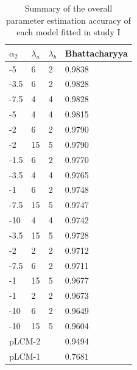 \documentclass[11 pt, a4paper]{article}  %
\begin{document}
\begin{table}[h]
\centering
\caption{Summary of the overall parameter estimation accuracy of each model fitted in study I}
\label{tab:result1}
\begin{tabular}{llll}
\hline
$\alpha_2$ & $\lambda_a$ & $\lambda_b$ & Bhattacharyya \\ \hline
-5         & 6           & 2           & 0.9838        \\
-3.5       & 6           & 2           & 0.9828        \\
-7.5       & 4           & 4           & 0.9828        \\
-5         & 4           & 4           & 0.9815        \\
-2         & 6           & 2           & 0.9790         \\
-2         & 15          & 5           & 0.9790         \\
-1.5       & 6           & 2           & 0.9770         \\
-3.5       & 4           & 4           & 0.9765        \\
-1         & 6           & 2           & 0.9748        \\
-7.5       & 15          & 5           & 0.9747        \\
-10        & 4           & 4           & 0.9742        \\
-3.5       & 15          & 5           & 0.9728        \\
-2         & 2           & 2           & 0.9712        \\
-7.5       & 6           & 2           & 0.9711        \\
-1         & 15          & 5           & 0.9677        \\
-1         & 2           & 2           & 0.9673        \\
-10        & 6           & 2           & 0.9649        \\
-10        & 15          & 5           & 0.9604        \\ \hline
\multicolumn{3}{l}{pLCM-2}             & 0.9494        \\
\multicolumn{3}{l}{pLCM-1}             & 0.7681        \\ \hline
\end{tabular}
\end{table}
\end{document}
